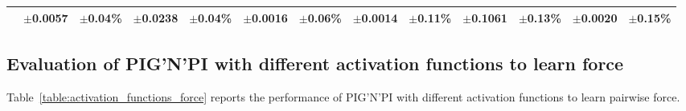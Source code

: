 \documentclass{article}
\newcommand{\pignpi}{PIG'N'PI\xspace}
\begin{document}
\begin{table}[H]
{\begin{tabularx}{1.2\textwidth}{cXXXXXXXXXXXX}
        & \scriptsize\textbf{$\pm$0.0057} & \scriptsize\textbf{$\pm$0.04\%} & \scriptsize\textbf{$\pm$0.0238} & \scriptsize\textbf{$\pm$0.04\%} & \scriptsize\textbf{$\pm$0.0016} & \scriptsize\textbf{$\pm$0.06\%} & \scriptsize\textbf{$\pm$0.0014} & \scriptsize\textbf{$\pm$0.11\%} & \scriptsize\textbf{$\pm$0.1061} & \scriptsize\textbf{$\pm$0.13\%} & \scriptsize\textbf{$\pm$0.0020} & \scriptsize\textbf{$\pm$0.15\%}\\      
      \bottomrule
\end{tabularx}
}
\end{table}

\clearpage






\subsection{Evaluation of \pignpi with different activation functions to learn force}
\label{sec:activation_function_force}
Table~\ref{table:activation_functions_force} reports the performance of \pignpi with different activation functions to learn pairwise force. 
\end{document}

